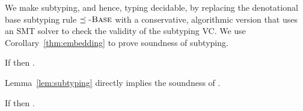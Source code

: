 %
We make subtyping, and hence, typing decidable,
by replacing the denotational base subtyping
rule $\preceq\textsc{-Base}$ with a conservative,
algorithmic version that uses an SMT
solver to check the validity of the subtyping VC.
%
We use Corollary~\ref{thm:embedding} to prove
soundness of subtyping. 
%
\begin{lemma}\label{lem:subtyping} %
If {}
then {}.
\end{lemma}

%
%
Lemma~\ref{lem:subtyping} directly implies the soundness of \smtlan.
%
\begin{theorem}\label{thm:soundness-smt}
If  then .
\end{theorem}


\begin{comment}
\begin{proof}
By rule \rsubbase, we need to show that
$\forall \sub\in\interp{\env}.
  \interp{\applysub{\sub}{\tref{v}{\btyp}{\refa_1}}}
  \subseteq
  \interp{\applysub{\sub}{\tref{v}{\btyp}{\refa_2}}}$.
%
We fix a $\sub\in\interp{\env}$.
and get that forall bindings
$(\tbind{x_i}{\tref{v}{\btyp^{\downarrow}}{\refa_i}}) \in \env$,
$\evalsto{\applysub{\sub}{e_i\subst{v}{x_i}}}{\etrue}$.

Then need to show that for each $e$,
if $e \in \interp{\applysub{\sub}{\tref{v}{\btyp}{\refa_1}}}$,
then $e \in \interp{\applysub{\sub}{\tref{v}{\btyp}{\refa_2}}}$.

If $e$ diverges then the statement trivially holds.
Assume $\evalsto{e}{w}$.
We need to show that
if $\evalsto{\applysub{\sub}{e_1\subst{v}{w}}}{\etrue}$
then $\evalsto{\applysub{\sub}{e_2\subst{v}{w}}}{\etrue}$.

Let \vsub the lifted substitution that satisfies the above.
Then  by Lemma~\ref{thm:embedding}
for each model $\bmodel \in \interp{\vsub}$,
$\bmodel\models\pred_i$, and $\bmodel\models q_1$
for
$\tologicshort{\env}{e_i\subst{v}{x_i}}{\btyp}{\pred_i}{\embed{\btyp}}{\smtenv_i}{\axioms_i}$
$\tologicshort{\env}{e_i\subst{v}{w}}{\btyp}{q_i}{\embed{\btyp}}{\smtenv_i}{\beta_i}$.
%
Since \aissubtype{\env}{\tref{v}{\btyp}{e_1}}{\tref{v}{\btyp}{e_2}} we get
$$
\bigwedge_i \pred_i
\Rightarrow q_1 \Rightarrow q_2
$$
thus $\bmodel\models q_2$.
%
By Theorem~\ref{thm:embedding} we get $\evalsto{\applysub{\sub}{\refa_2\subst{v}{w}}}{\etrue}$.
\end{proof}
\end{comment}
